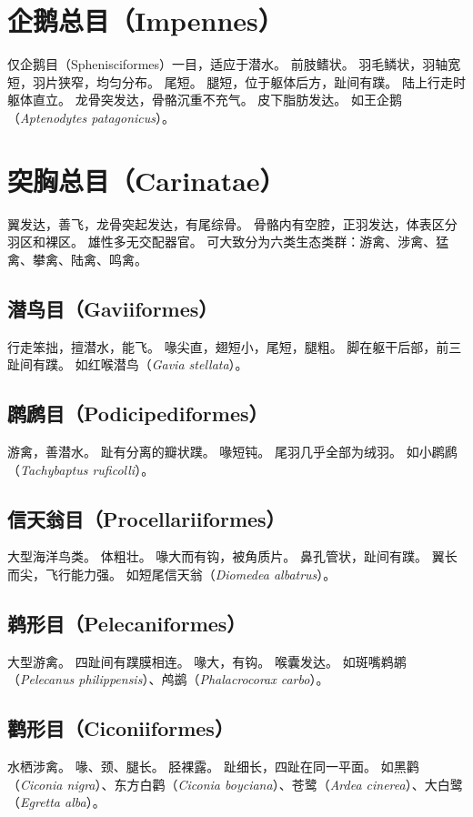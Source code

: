 \documentclass[11pt]{article}
\begin{document}
\section{企鹅总目（Impennes）}
仅企鹅目（Sphenisciformes）一目，适应于潜水。
前肢鳍状。
羽毛鳞状，羽轴宽短，羽片狭窄，均匀分布。
尾短。
腿短，位于躯体后方，趾间有蹼。
陆上行走时躯体直立。
龙骨突发达，骨骼沉重不充气。
皮下脂肪发达。
如王企鹅（\textit{Aptenodytes patagonicus}）。

\section{突胸总目（Carinatae）}
翼发达，善飞，龙骨突起发达，有尾综骨。
骨骼内有空腔，正羽发达，体表区分羽区和裸区。
雄性多无交配器官。
可大致分为六类生态类群：游禽、涉禽、猛禽、攀禽、陆禽、鸣禽。

\subsection{潜鸟目（Gaviiformes）}
行走笨拙，擅潜水，能飞。
喙尖直，翅短小，尾短，腿粗。
脚在躯干后部，前三趾间有蹼。
如红喉潜鸟（\textit{Gavia stellata}）。

\subsection{䴙䴘目（Podicipediformes）}
游禽，善潜水。
趾有分离的瓣状蹼。
喙短钝。
尾羽几乎全部为绒羽。
如小䴙䴘（\textit{Tachybaptus ruficolli}）。

\subsection{信天翁目（Procellariiformes）}
大型海洋鸟类。
体粗壮。
喙大而有钩，被角质片。
鼻孔管状，趾间有蹼。
翼长而尖，飞行能力强。
如短尾信天翁（\textit{Diomedea albatrus}）。

\subsection{鹈形目（Pelecaniformes）}
大型游禽。
四趾间有蹼膜相连。
喙大，有钩。
喉囊发达。
如斑嘴鹈鹕（\textit{Pelecanus philippensis}）、鸬鹚（\textit{Phalacrocorax carbo}）。

\subsection{鹳形目（Ciconiiformes）}
水栖涉禽。
喙、颈、腿长。
胫裸露。
趾细长，四趾在同一平面。
如黑鹳（\textit{Ciconia nigra}）、东方白鹳（\textit{Ciconia boyciana}）、苍鹭（\textit{Ardea cinerea}）、大白鹭（\textit{Egretta alba}）。
\end{document}
